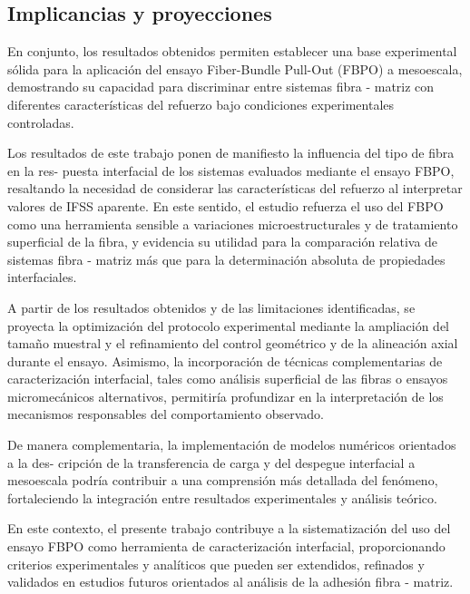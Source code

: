 \subsection{Implicancias y proyecciones}

En conjunto, los resultados obtenidos permiten establecer una base experimental sólida para la
aplicación del ensayo Fiber-Bundle Pull-Out (FBPO) a mesoescala, demostrando su capacidad para
discriminar entre sistemas fibra - matriz con diferentes características del refuerzo bajo
condiciones experimentales controladas.

Los resultados de este trabajo ponen de manifiesto la influencia del tipo de fibra en la res- puesta
interfacial de los sistemas evaluados mediante el ensayo FBPO, resaltando la necesidad de
considerar las características del refuerzo al interpretar valores de IFSS aparente. En este
sentido, el estudio refuerza el uso del FBPO como una herramienta sensible a variaciones
microestructurales y de tratamiento superficial de la fibra, y evidencia su utilidad para la
comparación relativa de sistemas fibra - matriz más que para la determinación absoluta de
propiedades interfaciales.

A partir de los resultados obtenidos y de las limitaciones identificadas, se proyecta la
optimización del protocolo experimental mediante la ampliación del tamaño muestral y el
refinamiento del control geométrico y de la alineación axial durante el ensayo. Asimismo, la
incorporación de técnicas complementarias de caracterización interfacial, tales como análisis
superficial de las fibras o ensayos micromecánicos alternativos, permitiría profundizar en la
interpretación de los mecanismos responsables del comportamiento observado.

De manera complementaria, la implementación de modelos numéricos orientados a la des- cripción de
la transferencia de carga y del despegue interfacial a mesoescala podría contribuir a una
comprensión más detallada del fenómeno, fortaleciendo la integración entre resultados
experimentales y análisis teórico.

En este contexto, el presente trabajo contribuye a la sistematización del uso del ensayo FBPO
como herramienta de caracterización interfacial, proporcionando criterios experimentales y
analíticos que pueden ser extendidos, refinados y validados en estudios futuros orientados al
análisis de la adhesión fibra - matriz.
